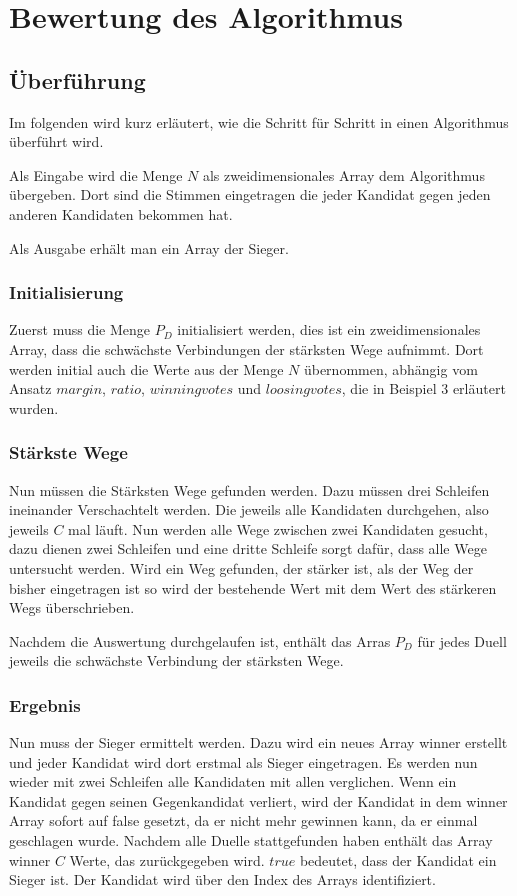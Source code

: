 \newpage
\section{Bewertung des Algorithmus}
\label{sec:Bewertung2}

\subsection{Überführung}
\label{sec:Ueberfuehrung}
Im folgenden wird kurz erläutert, wie die \schulze Schritt für Schritt in einen Algorithmus überführt wird.

Als Eingabe wird die Menge $N$ als zweidimensionales Array dem Algorithmus übergeben. Dort sind die Stimmen eingetragen die jeder Kandidat gegen jeden anderen Kandidaten bekommen hat.

Als Ausgabe erhält man ein Array der Sieger.

\subsubsection{Initialisierung}
\label{init}
Zuerst muss die Menge $P_{D}$ initialisiert werden, dies ist ein zweidimensionales Array, dass die schwächste Verbindungen der stärksten Wege aufnimmt. Dort werden initial auch die Werte aus der Menge $N$ übernommen, abhängig vom Ansatz $margin$, $ratio$, $winning votes$ und $loosing votes$, die in Beispiel 3 erläutert wurden.

\subsubsection{Stärkste Wege}
\label{starkeWege}
Nun müssen die Stärksten Wege gefunden werden. Dazu müssen drei Schleifen ineinander Verschachtelt werden. Die jeweils alle Kandidaten durchgehen, also jeweils $C$ mal läuft. Nun werden alle Wege zwischen zwei Kandidaten gesucht, dazu dienen zwei Schleifen und eine dritte Schleife sorgt dafür, dass alle Wege untersucht werden. Wird ein Weg gefunden, der stärker ist, als der Weg der bisher eingetragen ist so wird der bestehende Wert mit dem Wert des stärkeren Wegs überschrieben.  

Nachdem die Auswertung durchgelaufen ist, enthält das Arras $P_{D}$ für jedes Duell jeweils die schwächste Verbindung der stärksten Wege.

\subsubsection{Ergebnis}
Nun muss der Sieger ermittelt werden. Dazu wird ein neues Array winner erstellt und jeder Kandidat wird dort erstmal als Sieger eingetragen. Es werden nun wieder mit zwei Schleifen alle Kandidaten mit allen verglichen. Wenn ein Kandidat gegen seinen Gegenkandidat verliert, wird der Kandidat in dem winner Array sofort auf false gesetzt, da er nicht mehr gewinnen kann, da er einmal geschlagen wurde. Nachdem alle Duelle stattgefunden haben enthält das Array winner $C$ Werte, das zurückgegeben wird. $true$ bedeutet, dass der Kandidat ein Sieger ist. Der Kandidat wird über den Index des Arrays identifiziert.


